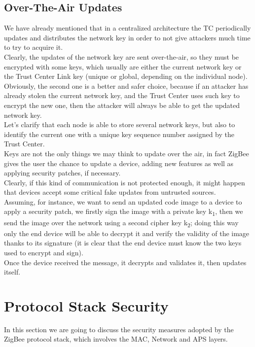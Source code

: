 \documentclass[12pt]{report}
\begin{document}
{\subsection{Over-The-Air Updates}
\bigskip
We have already mentioned that in a centralized architecture the TC periodically updates and distributes the network key in order to not give attackers much time to try to acquire it.\\
Clearly, the updates of the network key are sent over-the-air, so they must be encrypted with some keys, which usually are either the current network key or the Trust Center Link key (unique or global, depending on the individual node).\\
Obviously, the second one is a better and safer choice, because if an attacker has already stolen the current network key, and the Trust Center uses such key to encrypt the new one, then the attacker will always be able to get the updated network key.\\
Let's clarify that each node is able to store several network keys, but also to identify the current one with a unique key sequence number assigned by the Trust Center.\\

Keys are not the only things we may think to update over the air, in fact ZigBee gives the user the chance to update a device, adding new features as well as applying security patches, if necessary.\\
Clearly, if this kind of communication is not protected enough, it might happen that devices accept some critical fake updates from untrusted sources.\\
Assuming, for instance, we want to send an updated code image to a device to apply a security patch, we firstly sign the image with a private key k\textsubscript{1}, then we send the image over the network using a second cipher key k\textsubscript{2}; doing this way only the end device will be able to decrypt it and verify the validity of the image thanks to its signature (it is clear that the end device must know the two keys used to encrypt and sign).\\
Once the device received the message, it decrypts and validates it, then updates itself.\\

\clearpage
\section{Protocol Stack Security}
\bigskip
In this section we are going to discuss the security measures adopted by the ZigBee protocol stack, which involves the MAC, Network and APS layers.\\

}
\end{document}
